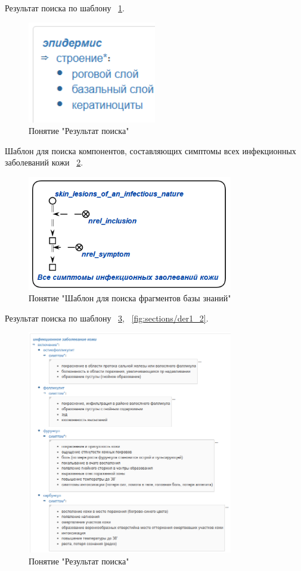 Результат поиска по шаблону
~\ref{fig:sections/der_2}.
\begin{figure}[H]
	\centering
	\includegraphics[width=0.5\textwidth]{sections/der_2.png}
	\caption{Понятие "Результат поиска"}
	\label{fig:sections/der_2}
\end{figure}

Шаблон для поиска компонентов, составляющих симптомы всех инфекционных заболеваний кожи
~\ref{fig:sections/pattern_1_der}.
\begin{figure}[H]
	\centering
	\includegraphics[width=0.8\textwidth]{sections/pattern_1_der.png}
	\caption{Понятие "Шаблон для поиска фрагментов базы знаний"}
	\label{fig:sections/pattern_1_der}
\end{figure}

Результат поиска по шаблону
~\ref{fig:sections/der1_1}, ~\ref{fig:sections/der1_2}.
\begin{figure}[H]
	\centering
	\includegraphics[width=0.8\textwidth]{sections/der1_1.png}
	\caption{Понятие "Результат поиска"}
	\label{fig:sections/der1_1}
\end{figure}

